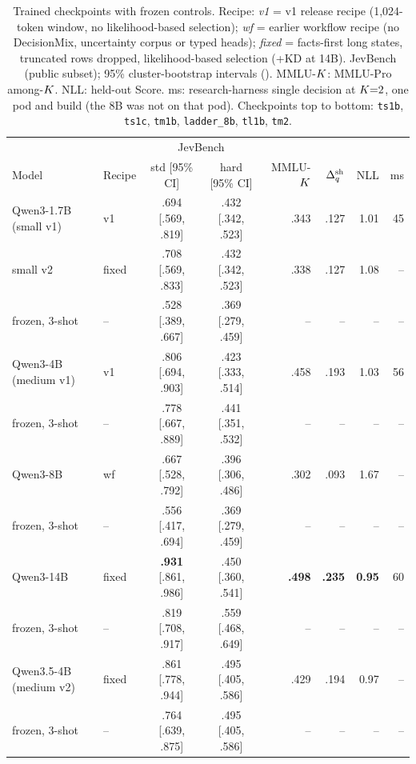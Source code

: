 \begin{table}[t]
  \centering
  \caption{Trained checkpoints with frozen controls. Recipe: \emph{v1} = v1 release recipe (1{,}024-token
  window, no likelihood-based selection); \emph{wf} = earlier workflow recipe (no DecisionMix, uncertainty
  corpus or typed heads); \emph{fixed} = facts-first long states, truncated rows dropped, likelihood-based
  selection (+KD at 14B). JevBench (public subset); 95\% cluster-bootstrap intervals
  (). MMLU-$K$: MMLU-Pro among-$K$. NLL: held-out Score. ms:
  research-harness single decision at $K{=}2$, one pod and build (the 8B was not on that pod).
  Checkpoints top to bottom: \texttt{ts1b},
  \texttt{ts1c}, \texttt{tm1b}, \texttt{ladder\_8b}, \texttt{tl1b}, \texttt{tm2}.}
  \label{tab:headline}
  \footnotesize
  \setlength{\tabcolsep}{2.5pt}
  \begin{tabular}{llccrrrr}
    \toprule
    & & \multicolumn{2}{c}{JevBench} & & & & \\
    Model & Recipe & std [95\% CI] & hard [95\% CI] & MMLU-$K$ & $\Delta_q^{\mathrm{sh}}$ & NLL & ms \\
    \midrule
    Qwen3-1.7B (small v1) & v1 & .694 [.569, .819] & .432 [.342, .523] & .343 & .127 & 1.01 & 45 \\
    \quad small v2 & fixed & .708 [.569, .833] & .432 [.342, .523] & .338 & .127 & 1.08 & -- \\
    \quad frozen, 3-shot & -- & .528 [.389, .667] & .369 [.279, .459] & -- & -- & -- & -- \\
    Qwen3-4B (medium v1) & v1 & .806 [.694, .903] & .423 [.333, .514] & .458 & .193 & 1.03 & 56 \\
    \quad frozen, 3-shot & -- & .778 [.667, .889] & .441 [.351, .532] & -- & -- & -- & -- \\
    Qwen3-8B & wf & .667 [.528, .792] & .396 [.306, .486] & .302 & .093 & 1.67 & -- \\
    \quad frozen, 3-shot & -- & .556 [.417, .694] & .369 [.279, .459] & -- & -- & -- & -- \\
    Qwen3-14B & fixed & \textbf{.931} [.861, .986] & .450 [.360, .541] & \textbf{.498} & \textbf{.235} & \textbf{0.95} & 60 \\
    \quad frozen, 3-shot & -- & .819 [.708, .917] & .559 [.468, .649] & -- & -- & -- & -- \\
    Qwen3.5-4B (medium v2) & fixed & .861 [.778, .944] & .495 [.405, .586] & .429 & .194 & 0.97 & -- \\
    \quad frozen, 3-shot & -- & .764 [.639, .875] & .495 [.405, .586] & -- & -- & -- & -- \\
    \bottomrule
  \end{tabular}
\end{table}

